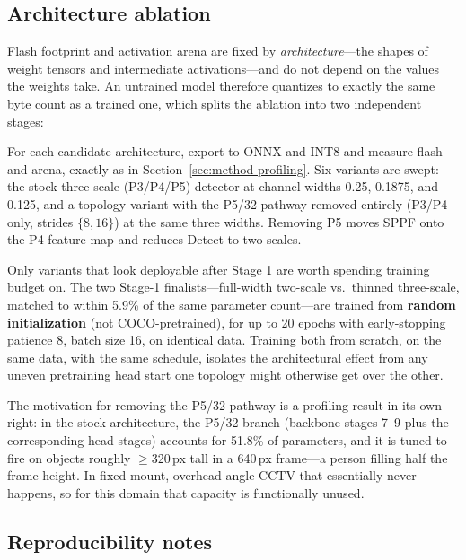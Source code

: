 \documentclass[11pt]{article}
\begin{document}
\subsection{Architecture ablation}
\label{sec:method-ablation}

Flash footprint and activation arena are fixed by \emph{architecture}---the
shapes of weight tensors and intermediate activations---and do not depend on
the values the weights take. An untrained model therefore quantizes to
exactly the same byte count as a trained one, which splits the ablation into
two independent stages:

\begin{description}[leftmargin=1.6em]
  \item[Stage 1 (cost, no training).] For each candidate architecture,
  export to ONNX and INT8 and measure flash and arena, exactly as in
  Section~\ref{sec:method-profiling}. Six variants are swept: the stock
  three-scale (P3/P4/P5) detector at channel widths 0.25, 0.1875, and 0.125,
  and a topology variant with the P5/32 pathway removed entirely (P3/P4
  only, strides $\{8,16\}$) at the same three widths. Removing P5 moves SPPF
  onto the P4 feature map and reduces Detect to two scales.
  \item[Stage 2 (accuracy, trained).] Only variants that look deployable
  after Stage 1 are worth spending training budget on. The two Stage-1
  finalists---full-width two-scale vs.\ thinned three-scale, matched to
  within 5.9\% of the same parameter count---are trained from
  \textbf{random initialization} (not COCO-pretrained), for up to 20 epochs
  with early-stopping patience 8, batch size 16, on identical data. Training
  both from scratch, on the same data, with the same schedule, isolates the
  architectural effect from any uneven pretraining head start one topology
  might otherwise get over the other.
\end{description}

The motivation for removing the P5/32 pathway is a profiling result in its
own right: in the stock architecture, the P5/32 branch (backbone stages 7--9
plus the corresponding head stages) accounts for 51.8\% of parameters, and it
is tuned to fire on objects roughly $\geq$320\,px tall in a 640\,px frame---a
person filling half the frame height. In fixed-mount, overhead-angle CCTV
that essentially never happens, so for this domain that capacity is
functionally unused.

\subsection{Reproducibility notes}
\end{document}
